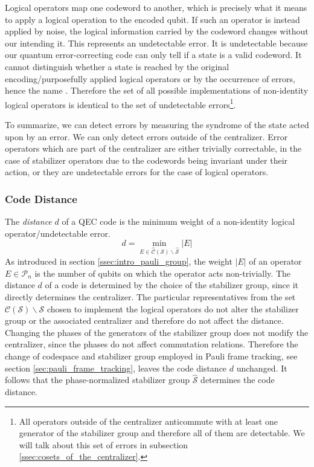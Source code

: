 Logical operators map one codeword to another, which is precisely what it means to apply a logical operation to the encoded qubit. 
If such an operator is instead applied by noise, the logical information carried by the codeword changes without our intending it. 
This represents an undetectable error. 
It is undetectable because our quantum error-correcting code can only tell if a state is a valid codeword. 
It cannot distinguish whether a state is reached by the original encoding/purposefully applied logical operators or by the occurrence of errors, hence the name \cite{gottesmann_book}. 
Therefore the set of all possible implementations of non-identity logical operators is identical to the set of undetectable errors\footnote{
    All operators outside of the centralizer anticommute with at least one generator of the stabilizer group and therefore all of them are detectable. 
    We will talk about this set of errors in subsection \ref{ssec:cosets_of_the_centralizer}.
    }.

To summarize, we can detect errors by measuring the syndrome of the state acted upon by an error. 
We can only detect errors outside of the centralizer.
Error operators which are part of the centralizer are either trivially correctable, in the case of stabilizer operators due to the codewords being invariant under their action,
or they are undetectable errors for the case of logical operators.

\subsubsection{Code Distance}\label{sssec:distance_stabilizer_formalism}
The \emph{distance} $d$ of a QEC code is the minimum weight of a non-identity logical operator/undetectable error.
\begin{equation}
    d = \min_{E\in \hat{\mathcal{C}}(\mathcal{S})\backslash \hat{\mathcal{S}}} |E|
\end{equation}
As introduced in section \ref{ssec:intro_pauli_group}, the weight $|E|$ of an operator $E\in \mathcal{P}_n$ is the number of qubits on which the operator acts non-trivially.
The distance $d$ of a code is determined by the choice of the stabilizer group, since it directly determines the centralizer. 
The particular representatives from the set $\mathcal{C}(\mathcal{S})\backslash \mathcal{S}$ 
chosen to implement the logical operators do not alter the stabilizer group 
or the associated centralizer and therefore do not affect the distance.
Changing the phases of the generators of the stabilizer group does not modify the centralizer, since the phases do not affect commutation relations. 
Therefore the change of codespace and stabilizer group employed in Pauli frame tracking, see section \ref{sec:pauli_frame_tracking}, leaves the code distance $d$ unchanged.
It follows that the phase-normalized stabilizer group  $\hat{\mathcal{S}}$ determines the code distance.

